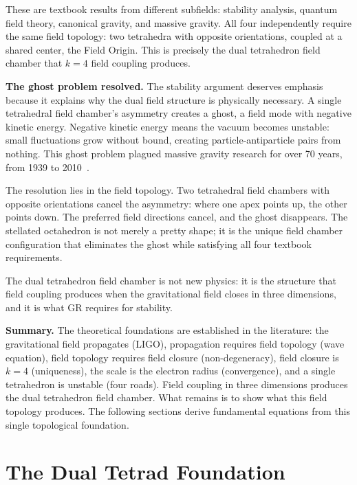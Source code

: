 \documentclass[aps,prd,preprint,superscriptaddress,showpacs,preprintnumbers,amsmath,amssymb,nofootinbib]{revtex4-2}
\begin{document}
These are textbook results from different subfields: stability analysis, quantum field theory, canonical gravity, and massive gravity. All four independently require the same field topology: two tetrahedra with opposite orientations, coupled at a shared center, the Field Origin. This is precisely the dual tetrahedron field chamber that $k = 4$ field coupling produces.

\textbf{The ghost problem resolved.} The stability argument deserves emphasis because it explains why the dual field structure is physically necessary. A single tetrahedral field chamber's asymmetry creates a ghost, a field mode with negative kinetic energy. Negative kinetic energy means the vacuum becomes unstable: small fluctuations grow without bound, creating particle-antiparticle pairs from nothing. This ghost problem plagued massive gravity research for over 70 years, from 1939 to 2010~\cite{boulware1972}.

The resolution lies in the field topology. Two tetrahedral field chambers with opposite orientations cancel the asymmetry: where one apex points up, the other points down. The preferred field directions cancel, and the ghost disappears. The stellated octahedron is not merely a pretty shape; it is the unique field chamber configuration that eliminates the ghost while satisfying all four textbook requirements.

The dual tetrahedron field chamber is not new physics: it is the structure that field coupling produces when the gravitational field closes in three dimensions, and it is what GR requires for stability.

\vspace{1em}
\noindent\textbf{Summary.} The theoretical foundations are established in the literature: the gravitational field propagates (LIGO), propagation requires field topology (wave equation), field topology requires field closure (non-degeneracy), field closure is $k = 4$ (uniqueness), the scale is the electron radius (convergence), and a single tetrahedron is unstable (four roads). Field coupling in three dimensions produces the dual tetrahedron field chamber. What remains is to show what this field topology produces. The following sections derive fundamental equations from this single topological foundation.

\section{The Dual Tetrad Foundation}
\label{sec:foundation}
\end{document}
